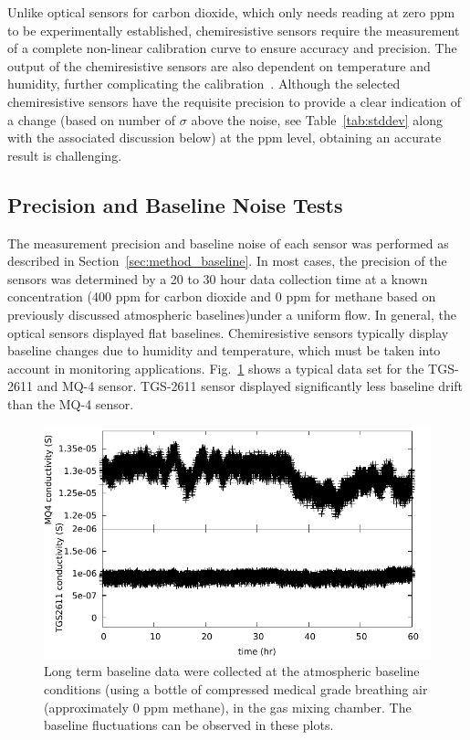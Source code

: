 \documentclass[sensors,article,submit,moreauthors,pdftex]{Definitions/mdpi}
\begin{document}
			Unlike optical sensors for carbon dioxide, which only needs reading at zero ppm to be experimentally established, chemiresistive sensors require the measurement of a complete non-linear calibration curve to ensure accuracy and precision.
			The output of the chemiresistive sensors are also dependent on temperature and humidity, further complicating the calibration~\cite{benkstein_analytical_2014}.
			Although the selected chemiresistive sensors have the requisite precision to provide a clear indication of a change (based on number of $\sigma$ above the noise, see Table~\ref{tab:stddev} along with the associated discussion below) at the ppm level, obtaining an accurate result is challenging.
			

		\subsection{Precision and Baseline Noise Tests}
			\label{sec:main_baseline}
			
			The measurement precision and baseline noise of each sensor was performed as described in Section~\ref{sec:method_baseline}.
			In most cases, the precision of the sensors was determined by a 20 to 30 hour data collection time at a known concentration (400 ppm for carbon dioxide and 0 ppm for methane based on previously discussed atmospheric baselines)under a uniform flow.
			In general, the optical sensors displayed flat baselines. Chemiresistive sensors typically display baseline changes due to humidity and temperature, which must be taken into account in monitoring applications. Fig.~\ref{fig:MQ4TGSbaseline} shows a typical data set for the TGS-2611 and MQ-4 sensor.
			TGS-2611 sensor displayed significantly less baseline drift than the MQ-4 sensor.
			
			
			\begin{figure}[!t]
				\centering
				\includegraphics[width=\columnwidth]{honey5.pdf}
				\caption{Long term baseline data were collected at the atmospheric baseline conditions (using a bottle of compressed medical grade breathing air (approximately 0 ppm methane), in the gas mixing chamber.
				The baseline fluctuations can be observed in these plots.}
				\label{fig:MQ4TGSbaseline}
			\end{figure}
			
\end{document}
